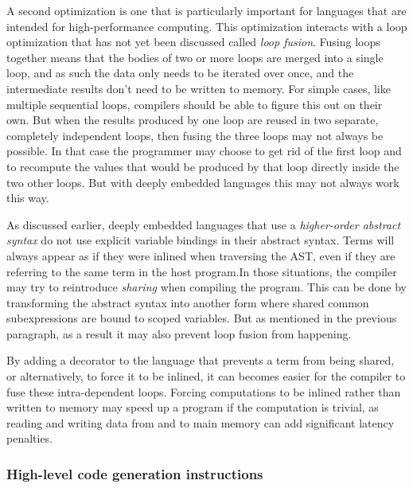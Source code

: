 \documentclass[fontsize=11pt,a4paper,parskip=half,numbers=noenddot]{scrartcl}
\begin{document}
A second optimization is one that is particularly important for languages that
are intended for high-performance computing. This optimization interacts with a
loop optimization that has not yet been discussed called \emph{loop fusion}.
Fusing loops together means that the bodies of two or more loops are merged into
a single loop, and as such the data only needs to be iterated over once, and the
intermediate results don't need to be written to memory. For simple cases, like
multiple sequential loops, compilers should be able to figure this out on their
own. But when the results produced by one loop are reused in two separate,
completely independent loops, then fusing the three loops may not always be
possible. In that case the programmer may choose to get rid of the first loop
and to recompute the values that would be produced by that loop directly inside
the two other loops. But with deeply embedded languages this may not always work
this way.

As discussed earlier, deeply embedded languages that use a \emph{higher-order
  abstract syntax} do not use explicit variable bindings in their abstract
syntax. Terms will always appear as if they were inlined when traversing the
AST, even if they are referring to the same term in the host program.\@ In those
situations, the compiler may try to reintroduce \emph{sharing} when compiling
the program. This can be done by transforming the abstract syntax into another
form where shared common subexpressions are bound to scoped variables. But as
mentioned in the previous paragraph, as a result it may also prevent loop fusion
from happening.

By adding a decorator to the language that prevents a term from being shared, or
alternatively, to force it to be inlined, it can becomes easier for the compiler
to fuse these intra-dependent loops. Forcing computations to be inlined rather
than written to memory may speed up a program if the computation is trivial, as
reading and writing data from and to main memory can add significant latency
penalties.

\subsubsection{High-level code generation instructions}

\end{document}
